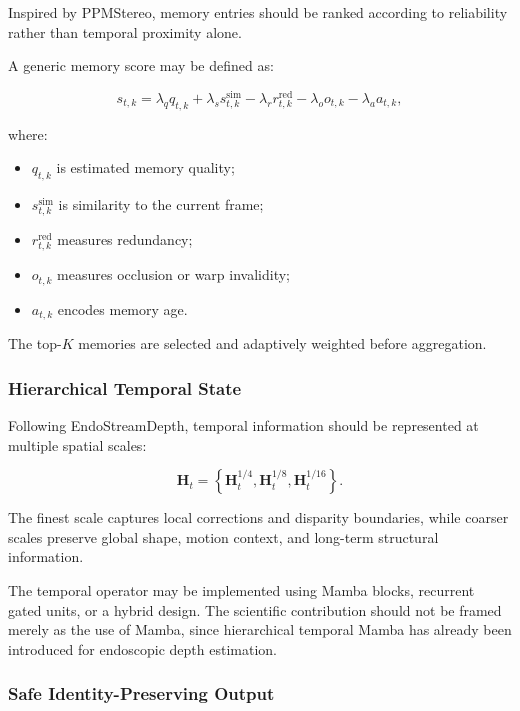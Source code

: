 \documentclass[11pt,a4paper]{article}
\begin{document}
Inspired by PPMStereo, memory entries should be ranked according to reliability rather than temporal proximity alone.

A generic memory score may be defined as:

\begin{equation}
s_{t,k}
=
\lambda_q q_{t,k}
+
\lambda_s s_{t,k}^{\mathrm{sim}}
-
\lambda_r r_{t,k}^{\mathrm{red}}
-
\lambda_o o_{t,k}
-
\lambda_a a_{t,k},
\end{equation}

where:

\begin{itemize}
    \item $q_{t,k}$ is estimated memory quality;
    \item $s_{t,k}^{\mathrm{sim}}$ is similarity to the current frame;
    \item $r_{t,k}^{\mathrm{red}}$ measures redundancy;
    \item $o_{t,k}$ measures occlusion or warp invalidity;
    \item $a_{t,k}$ encodes memory age.
\end{itemize}

The top-$K$ memories are selected and adaptively weighted before aggregation.

\subsubsection{Hierarchical Temporal State}

Following EndoStreamDepth, temporal information should be represented at multiple spatial scales:

\begin{equation}
\mathbf{H}_t
=
\left\{
\mathbf{H}_t^{1/4},
\mathbf{H}_t^{1/8},
\mathbf{H}_t^{1/16}
\right\}.
\end{equation}

The finest scale captures local corrections and disparity boundaries, while coarser scales preserve global shape, motion context, and long-term structural information.

The temporal operator may be implemented using Mamba blocks, recurrent gated units, or a hybrid design. The scientific contribution should not be framed merely as the use of Mamba, since hierarchical temporal Mamba has already been introduced for endoscopic depth estimation.

\subsubsection{Safe Identity-Preserving Output}
\end{document}
